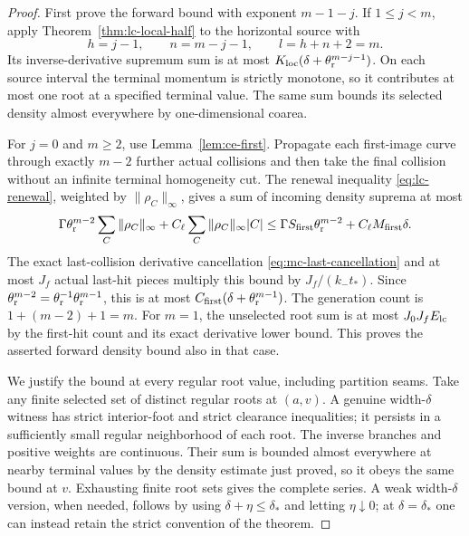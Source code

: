 \begin{proof}
First prove the forward bound with exponent $m-1-j$.  If
$1\le j<m$, apply Theorem~\ref{thm:lc-local-half} to the
horizontal source with
\[
 h=j-1,\qquad n=m-j-1,\qquad l=h+n+2=m .
\]
Its inverse-derivative supremum sum is at most
$K_{\rm loc}(\delta+\theta_{\rm r}^{m-j-1})$.  On each
source interval the terminal momentum is strictly monotone,
so it contributes at most one root at a specified terminal
value.  The same sum bounds its selected density almost
everywhere by one-dimensional coarea.

For $j=0$ and $m\ge2$, use Lemma~\ref{lem:ce-first}.
Propagate each first-image curve through exactly $m-2$ further
actual collisions and then take the final collision without an
infinite terminal homogeneity cut.  The renewal inequality
\eqref{eq:lc-renewal}, weighted by $\|\rho_C\|_\infty$,
gives a sum of incoming density suprema at most
\[
 \Gamma\theta_{\rm r}^{m-2}
          \sum_C\|\rho_C\|_\infty
            +C_\ell\sum_C\|\rho_C\|_\infty|C|
 \le \Gamma S_{\rm first}\theta_{\rm r}^{m-2}
                          +C_\ell M_{\rm first}\delta .
\]
The exact last-collision derivative cancellation
\eqref{eq:mc-last-cancellation} and at most $J_f$ actual
last-hit pieces multiply this bound by $J_f/(k_-t_*)$.
Since $\theta_{\rm r}^{m-2}
=\theta_{\rm r}^{-1}\theta_{\rm r}^{m-1}$, this is at most
$C_{\rm first}(\delta+\theta_{\rm r}^{m-1})$.
The generation count is $1+(m-2)+1=m$.
For $m=1$, the unselected root sum is at most
$J_0J_fE_{\rm lc}$ by the first-hit count and its exact
derivative lower bound.  This proves the asserted forward
density bound also in that case.

We justify the bound at every regular root value, including
partition seams.  Take any finite selected set of distinct
regular roots at $(a,v)$.  A genuine width-$\delta$ witness
has strict interior-foot and strict clearance inequalities;
it persists in a sufficiently small regular neighborhood
of each root.  The inverse branches and positive weights
are continuous.  Their sum is bounded almost everywhere at
nearby terminal values by the density estimate just proved,
so it obeys the same bound at $v$.  Exhausting finite root
sets gives the complete series.  A weak width-$\delta$ version,
when needed, follows by using $\delta+\eta\le\delta_*$
and letting $\eta\downarrow0$; at $\delta=\delta_*$ one can
instead retain the strict convention of the theorem.


\end{proof}
